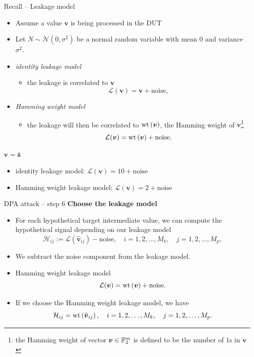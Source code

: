 \begin{frame}{Recall -- Leakage model}
    \begin{itemize}
        \item Assume a value $\boldsymbol{v}$ is being processed in the DUT
        \item Let $N\sim\mathcal{N}(0,\sigma^2)$ be a normal random variable with mean $0$ and variance $\sigma^2$.
        \item \textit{identity leakage model}
        \begin{itemize}
            \item the leakage is correlated to $\boldsymbol{v}$
            \[
\mathcal{L}(\boldsymbol{v})=\boldsymbol{v}+\text{noise},
\]
        \end{itemize}
        \item \textit{Hamming weight model}
        \begin{itemize}
            \item the leakage will then be correlated to $\textrm{wt}\left(\boldsymbol{v}\right)$, the Hamming weight of $\boldsymbol{v}$\footnote{the Hamming weight of vector $\boldsymbol{v}\in{\mathbb F}_2^m$ is defined to be the number of $1$s in $\boldsymbol{v}$}
            \[
    \mathcal{L}(\boldsymbol{v})=\textrm{wt}\left(\boldsymbol{v}\right)+\text{noise}.
\]
        \end{itemize}
    \end{itemize}
    \begin{example}
    $\boldsymbol{v}=\texttt{A}$
    \begin{itemize}
        \item identity leakage model: $\mathcal{L}(\boldsymbol{v})=10+\text{noise}$
        \item Hamming weight leakage model: $\mathcal{L}(\boldsymbol{v})=2+\text{noise}$
    \end{itemize}
    \end{example}
\end{frame}

\begin{frame}{DPA attack -- step 6}
    \textbf{Choose the leakage model}
    \begin{itemize}
        \item For each hypothetical target intermediate value, we can compute the hypothetical signal depending on our leakage model
    \[
    \mathcal{H}_{ij}:=\mathcal{L}(\hat{\boldsymbol{v}}_{ij})-\text{noise},\quad i=1,2,\dots,M_k,\quad j=1,2,\dots,M_p,
    \]
    \item We subtract the noise component from the leakage model.
    \item Hamming weight leakage model
    \[
    \mathcal{L}(\boldsymbol{v})=\textrm{wt}\left(\boldsymbol{v}\right)+\text{noise}.
    \]
    \item If we choose the Hamming weight leakage model, we have
    \[
    \mathcal{H}_{ij}=\textrm{wt}\left(\hat{\boldsymbol{v}}_{ij}\right),\quad i=1,2,\dots,M_k,\quad j=1,2,\dots,M_p.
    \]
    \end{itemize}
\end{frame}

